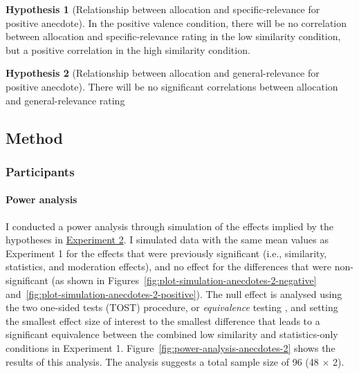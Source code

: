 \documentclass[a4paper, nobind, dvipsnames]{templates/ociamthesis}
\theoremstyle{definition}
\theoremstyle{definition}
\theoremstyle{definition}
\theoremstyle{definition}
\newtheorem{hypothesis}{Hypothesis}[chapter]
\theoremstyle{remark}
\begin{document}
\begin{hypothesis}[Relationship between allocation and specific-relevance for positive anecdote]
\protect\hypertarget{hyp:allocation-specific-relevance-anecdotes-2}{}{\label{hyp:allocation-specific-relevance-anecdotes-2} {} }In the positive valence condition, there will be no correlation between
allocation and specific-relevance rating in the low similarity condition, but a
positive correlation in the high similarity condition.
\end{hypothesis}

\begin{hypothesis}[Relationship between allocation and general-relevance for positive anecdote]
\protect\hypertarget{hyp:allocation-general-relevance-anecdotes-2}{}{\label{hyp:allocation-general-relevance-anecdotes-2} {} }There will be no significant correlations between allocation and
general-relevance rating
\end{hypothesis}

\subsection{Method}

\subsubsection{Participants}

\hypertarget{power-analysis-anecdotes-2}{%
\paragraph{Power analysis}\label{power-analysis-anecdotes-2}}

I conducted a power analysis through simulation of the effects implied by the
hypotheses in \protect\hyperlink{anecdotes-2}{Experiment 2}. I simulated data with the same mean
values as Experiment 1 for the effects that were previously significant (i.e.,
similarity, statistics, and moderation effects), and no effect for the
differences that were non-significant (as shown in
Figures~\ref{fig:plot-simulation-anecdotes-2-negative}
and~\ref{fig:plot-simulation-anecdotes-2-positive}). The null effect is
analysed using the two one-sided tests (TOST) procedure, or \emph{equivalence}
testing \autocite{lakens2018}, and setting the smallest effect size of interest to the
smallest difference that leads to a significant equivalence between the combined
low similarity and statistics-only conditions in Experiment 1.
Figure~\ref{fig:power-analysis-anecdotes-2} shows the results of this analysis.
The analysis suggests a total sample size of 96
(48 \(\times\) 2).
\end{document}
